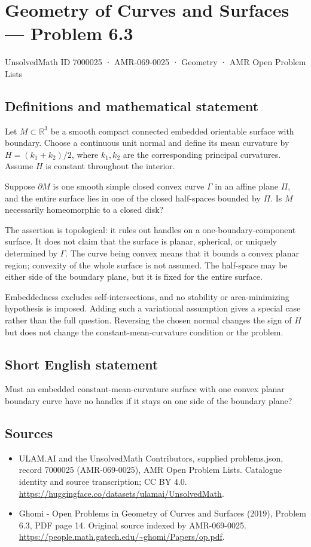 \documentclass[11pt,a4paper]{article}
\begin{document}
\section*{Geometry of Curves and Surfaces — Problem 6.3}\label{7000025}
{\small UnsolvedMath ID 7000025 · AMR-069-0025 · Geometry · AMR Open Problem Lists}
\subsection{Definitions and mathematical statement}
Let $M\subset\mathbb R^3$ be a smooth compact connected embedded
orientable surface with boundary. Choose a continuous unit
normal and define its mean curvature by
$H=(k_1+k_2)/2$, where $k_1,k_2$ are the corresponding principal
curvatures. Assume $H$ is constant throughout the interior.

Suppose $\partial M$ is one smooth simple closed convex curve
$\Gamma$ in an affine plane $\Pi$, and the entire surface lies
in one of the closed half-spaces bounded by $\Pi$. Is $M$
necessarily homeomorphic to a closed disk?

The assertion is topological: it rules out handles on a
one-boundary-component surface. It does not claim that the
surface is planar, spherical, or uniquely determined by
$\Gamma$. The curve being convex means that it bounds a
convex planar region; convexity of the whole surface is not
assumed. The half-space may be either side of the boundary
plane, but it is fixed for the entire surface.

Embeddedness excludes self-intersections, and no stability or
area-minimizing hypothesis is imposed. Adding such a variational
assumption gives a special case rather than the full question.
Reversing the chosen normal changes the sign of $H$ but does
not change the constant-mean-curvature condition or the problem.
\subsection{Short English statement}
Must an embedded constant-mean-curvature surface with one convex
planar boundary curve have no handles if it stays on one side
of the boundary plane?
\subsection{Sources}
\begin{itemize}
\item[S1] ULAM.AI and the UnsolvedMath Contributors, supplied problems.json, record 7000025 (AMR-069-0025), AMR Open Problem Lists. Catalogue identity and source transcription; CC BY 4.0.
\url{https://huggingface.co/datasets/ulamai/UnsolvedMath}.
\item[S2] Ghomi - Open Problems in Geometry of Curves and Surfaces (2019), Problem 6.3, PDF page 14. Original source indexed by AMR-069-0025.
\url{https://people.math.gatech.edu/~ghomi/Papers/op.pdf}.
\end{itemize}
\end{document}
